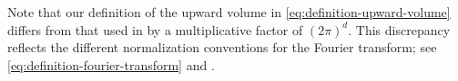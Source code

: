 \documentclass[a4paper,12pt]{article}
\newtheorem{theorem}{Theorem}%
\newcommand{\R}{\mathbb{R}}
\newcommand{\ecfup}{M^{\uparrow}}
\newcommand{\volup}{V^{\uparrow}}
\newcommand{\hyposymbclass}{\text{H}\Gamma^{m_-,m_+}_\rho}
\newcommand{\symbolnot}{\sigma}
\begin{document}

\noindent
Note that our definition of the upward volume in
\eqref{eq:definition-upward-volume} differs from that used in
\cite[Theorem~30.1]{shubin_pseudodifferential_2001} by a multiplicative factor of
$(2\pi)^d$.
This discrepancy reflects the different normalization conventions for the
Fourier transform; see \eqref{eq:definition-fourier-transform} and
\cite[eq.~(1.2)]{shubin_pseudodifferential_2001}.
\end{document}
